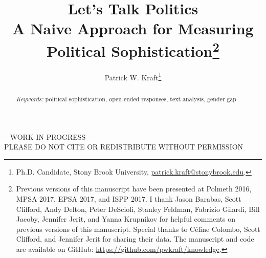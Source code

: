 \documentclass[12pt]{article}
\author{Patrick W. Kraft\footnote{Ph.D. Candidate, Stony Brook University, \href{mailto:patrick.kraft@stonybrook.edu}{patrick.kraft@stonybrook.edu}.
}}
\title{Let's Talk Politics\\
\large{A Naive Approach for Measuring Political Sophistication}\footnote{Previous versions of this manuscript have been presented at Polmeth 2016, MPSA 2017, EPSA 2017, and ISPP 2017.
I thank Jason Barabas, Scott Clifford, Andy Delton, Peter DeScioli, Stanley Feldman, Fabrizio Gilardi, Bill Jacoby, Jennifer Jerit, and Yanna Krupnikov for helpful comments on previous versions of this manuscript. Special thanks to C{\'e}line Colombo, Scott Clifford, and Jennifer Jerit for sharing their data. The manuscript and code are available on GitHub: \url{https://github.com/pwkraft/knowledge}.
}
}
\date{}
\begin{document}
\maketitle
\doublespacing
\thispagestyle{empty}

\begin{center}
-- WORK IN PROGRESS -- \\
PLEASE DO NOT CITE OR REDISTRIBUTE WITHOUT PERMISSION
\end{center} 

\hfill
\begin{abstract}\singlespacing


\vspace{\baselineskip}
\noindent \textit{Keywords:} political sophistication, open-ended responses, text analysis, gender gap
\end{abstract}
\hfill

\newpage\setcounter{page}{1}


\clearpage
\singlespacing



\clearpage

\end{document}
